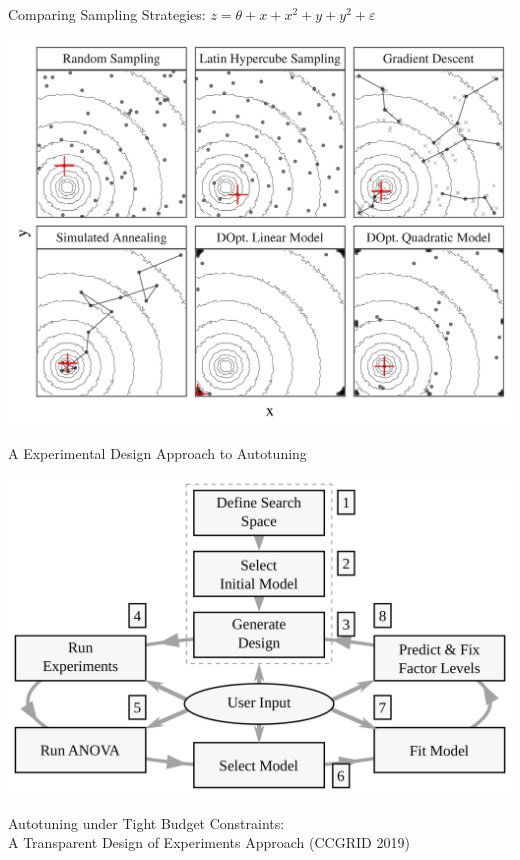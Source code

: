 \documentclass[10pt, compress, aspectratio=169, xcolor={table,usenames,dvipsnames}]{beamer}
\begin{document}
\begin{frame}[label={sec:org26e8c02}]{Comparing Sampling Strategies: \(z = \theta + x + x^2 + y + y^2 + \varepsilon\)}
\begin{center}
\begin{center}
\includegraphics[width=.72\textwidth]{../../../img/sampling_comparison.pdf}
\end{center}
\end{center}
\end{frame}
\begin{frame}[label={sec:org2e7224a}]{A Experimental Design Approach to Autotuning}
\begin{center}
\begin{center}
\includegraphics[width=.74\linewidth]{../../../img/doe_anova_strategy.pdf}
\end{center}

\vspace{-.2cm}
\end{center}

\begin{center}
\scriptsize{Autotuning under Tight Budget Constraints: \\ A Transparent Design of Experiments Approach (CCGRID 2019)}
\end{center}
\end{frame}
\end{document}
